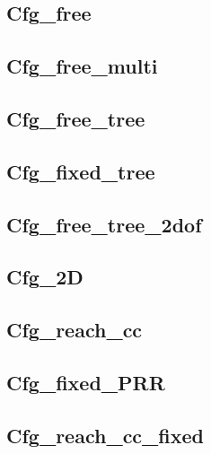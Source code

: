 
\subsection{Cfg\_free}

\subsection{Cfg\_free\_multi}

\subsection{Cfg\_free\_tree}

\subsection{Cfg\_fixed\_tree}


\subsection{Cfg\_free\_tree\_2dof}

\subsection{Cfg\_2D}

\subsection{Cfg\_reach\_cc}




\subsection{Cfg\_fixed\_PRR}



\subsection{Cfg\_reach\_cc\_fixed}